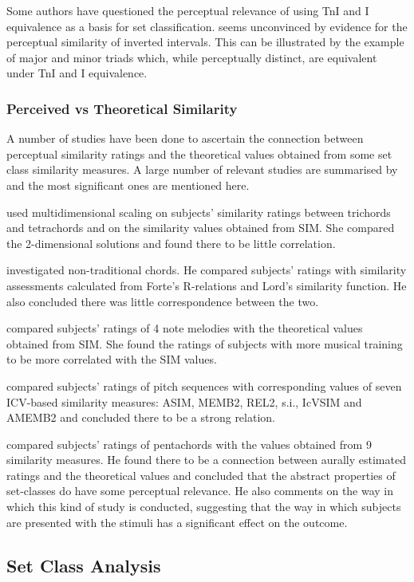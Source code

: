\documentclass{article}
\begin{document}
Some authors have questioned the perceptual relevance of using TnI and
I equivalence as a basis for set classification. \citet{Deutsch1982}
seems unconvinced by evidence for the perceptual similarity of
inverted intervals. This can be illustrated by the example of major
and minor triads which, while perceptually distinct, are equivalent
under TnI and I equivalence.
\subsubsection{Perceived vs Theoretical Similarity}
\label{sec-3-5-3}

A number of studies have been done to ascertain the connection between
perceptual similarity ratings and the theoretical values obtained from
some set class similarity measures. A large number of relevant studies
are summarised by \citet{Kuusi2001} and the most significant ones are
mentioned here.

\citet{Bruner1984} used multidimensional scaling on subjects'
similarity ratings between trichords and tetrachords and on the
similarity values obtained from SIM. She compared the
2-dimensional solutions and found there to be little correlation.

\citet{Gibson1986} investigated non-traditional chords. He compared
subjects' ratings with similarity assessments calculated from Forte's
R-relations and Lord's similarity function. He also concluded there
was little correspondence between the two.

\citet{Stammers1994} compared subjects' ratings of 4 note melodies with
the theoretical values obtained from SIM. She found the ratings of
subjects with more musical training to be more correlated with the SIM
values.

\citet{Lane1997} compared subjects' ratings of pitch sequences with
corresponding values of seven ICV-based similarity measures: ASIM,
MEMB2, REL2, s.i., IcVSIM and AMEMB2 and concluded there to be a
strong relation.

\citet{Kuusi2001} compared subjects' ratings of pentachords with the
values obtained from 9 similarity measures. He found there to be a
connection between aurally estimated ratings and the theoretical
values and concluded that the abstract properties of set-classes do
have some perceptual relevance. He also comments on the way in which
this kind of study is conducted, suggesting that the way in which
subjects are presented with the stimuli has a significant effect on
the outcome.
\subsection{Set Class Analysis}
\label{sec-3-6}
\end{document}
